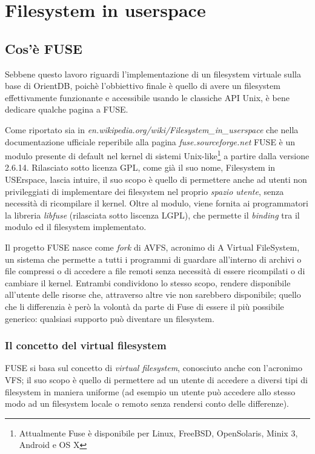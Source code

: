 \chapter{Filesystem in userspace}
\section{Cos'è FUSE}
Sebbene questo lavoro riguardi l'implementazione di un filesystem virtuale sulla base di OrientDB, poichè l'obbiettivo finale è quello di avere un filesystem effettivamente funzionante e accessibile usando le classiche API Unix, è bene dedicare qualche pagina a FUSE.

Come riportato sia in \emph{en.wikipedia.org/wiki/Filesystem\_in\_userspace} che nella documentazione ufficiale reperibile alla pagina \emph{fuse.sourceforge.net} FUSE è un modulo presente  di default nel kernel di sistemi Unix-like\footnote{Attualmente Fuse è disponibile per Linux, FreeBSD, OpenSolaris, Minix 3, Android e OS X} a partire dalla versione 2.6.14. Rilasciato sotto licenza GPL, come già il suo nome, Filesystem in USErspace, lascia intuire, il suo scopo è quello di permettere anche ad utenti non privileggiati di implementare dei filesystem nel proprio \emph{spazio utente}, senza necessità di ricompilare il kernel. Oltre al modulo, viene fornita ai programmatori la libreria \emph{libfuse} (rilasciata sotto liscenza LGPL), che permette il \emph{binding} tra il modulo ed il filesystem implementato.

Il progetto FUSE nasce come \emph{fork} di AVFS, acronimo di A Virtual FileSystem, un sistema che permette a tutti i programmi di guardare all'interno di archivi o file compressi o di accedere a file remoti senza necessità di essere ricompilati o di cambiare il kernel. Entrambi condividono lo stesso scopo, rendere disponibile all'utente delle risorse che, attraverso altre vie non sarebbero disponibile; quello che li differenzia è però la volontà da parte di Fuse di essere il più possibile generico: qualsiasi supporto può diventare un filesystem.

\subsection{Il concetto del virtual filesystem}
FUSE si basa sul concetto di \emph{virtual filesystem}, conosciuto anche con l'acronimo VFS; il suo scopo è quello di permettere ad un utente di accedere a diversi tipi di filesystem in maniera uniforme (ad esempio un utente può accedere allo stesso modo ad un filesystem locale o remoto senza rendersi conto delle differenze).

